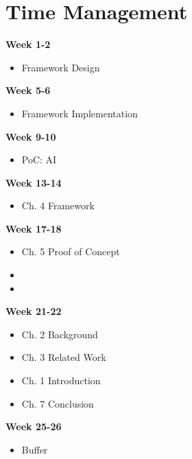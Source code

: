 \documentclass[a4paper,11pt]{article}
\begin{document}
\section{Time Management}
\begin{minipage}[t]{.45\textwidth}
    \textbf{Week 1-2}
    \begin{itemize}
        \item Framework Design
    \end{itemize}
    \textbf{Week 5-6}
    \begin{itemize}
        \item Framework Implementation
    \end{itemize}
    \textbf{Week 9-10}
    \begin{itemize}
        \item PoC: AI
    \end{itemize}
    \textbf{Week 13-14}
    \begin{itemize}
        \item Ch. 4 Framework
    \end{itemize}
    \textbf{Week 17-18}
    \begin{itemize}
        \item Ch. 5 Proof of Concept
        \item[]
        \item[]
    \end{itemize}
    \textbf{Week 21-22}
    \begin{itemize}
        \item Ch. 2 Background
        \item Ch. 3 Related Work
        \item Ch. 1 Introduction
        \item Ch. 7 Conclusion
    \end{itemize}
    \textbf{Week 25-26}
    \begin{itemize}
        \item Buffer
    \end{itemize}
\end{minipage}
\hfill
\end{document}
